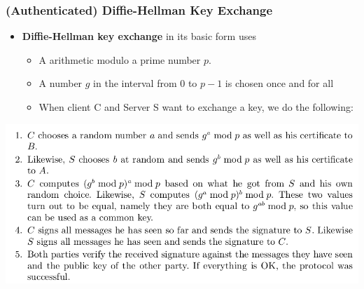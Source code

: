 \documentclass[11pt]{article}
\begin{document}
\subsubsection{(Authenticated) Diffie-Hellman Key Exchange}
\label{sec:org84fb5dd}
\begin{itemize}
\item \textbf{Diffie-Hellman key exchange} in its basic form uses
\begin{itemize}
\item A arithmetic modulo a prime number \(p\).
\item A number \(g\) in the interval from \(0\) to \(p−1\) is chosen once and for all
\item When client C and Server S want to exchange a key, we do the following:
\end{itemize}
\end{itemize}
\begin{center}
\includegraphics[width=.9\linewidth]{Network Security Mechanisms (12)/screenshot_2018-11-11_20-07-37.png}
\end{center}
\end{document}
